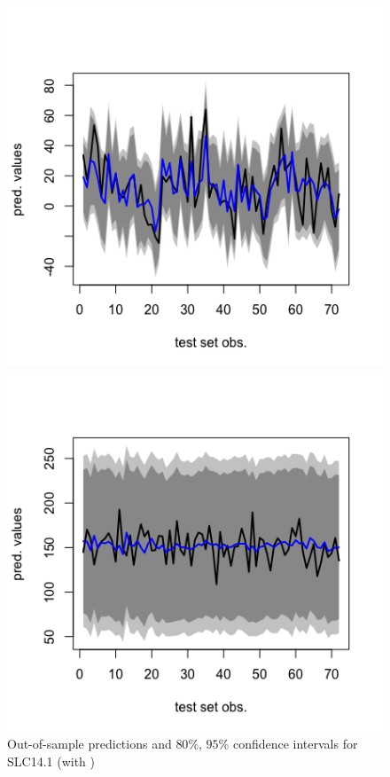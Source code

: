 \begin{figure}[!htb]
\centering
    \begin{minipage}{.5\textwidth}
        \centering
        \includegraphics[width=1.064\linewidth, height=0.35\textheight]{gfx/chapter-bayesianrvfl/SLC14_1_seed456.png}
        \caption{Out-of-sample predictions and $80$\%, $95$\% confidence intervals for SLC14.1 (with )}
        \label{gfx/chapter-bayesianrvfl/oos_SLC14_1_seed456}
    \end{minipage}%
    \begin{minipage}{0.5\textwidth}
        \centering
        \includegraphics[width=1.064\linewidth, height=0.35\textheight]{gfx/chapter-bayesianrvfl/SLC14_2_seed456.png}

\end{minipage}
\end{figure}
